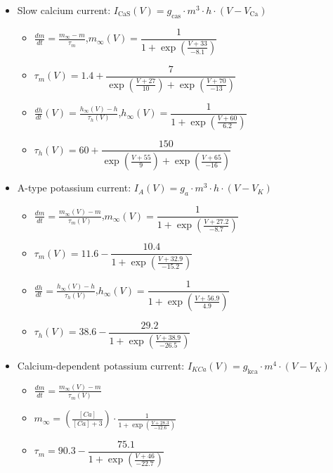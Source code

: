 \documentclass[../main.tex]{subfiles}
\begin{document}
\begin{itemize}
    \item Slow calcium current:
    $I_{\text{CaS}}(V) = g_{\text{cas}} \cdot m^3 \cdot h \cdot (V - V_{\text{Ca}})$
    \begin{itemize}[label=\textopenbullet]
        \item $\frac{dm}{dt} = \frac{m_\infty - m}{\tau_m}$,\quad $m_\infty(V) = \dfrac{1}{1 + \exp\left(\frac{V + 33}{-8.1}\right)}$
        \item $\tau_m(V) = 1.4 + \dfrac{7}{\exp\left(\frac{V + 27}{10}\right) + \exp\left(\frac{V + 70}{-13}\right)}$
        \item $\frac{dh}{dt}(V) = \frac{h_\infty(V) - h}{\tau_h(V)}$,\quad $h_\infty(V) = \dfrac{1}{1 + \exp\left(\frac{V + 60}{6.2}\right)}$
        \item $\tau_h(V) = 60 + \dfrac{150}{\exp\left(\frac{V + 55}{9}\right) + \exp\left(\frac{V + 65}{-16}\right)}$
    \end{itemize}

    \item A-type potassium current:
    $I_{A}(V) = g_{a} \cdot m^3 \cdot h \cdot (V - V_{K})$
    \begin{itemize}[label=\textopenbullet]
        \item $\frac{dm}{dt} = \frac{m_\infty(V) - m}{\tau_m(V)}$,\quad $m_\infty(V) = \dfrac{1}{1 + \exp\left(\frac{V + 27.2}{-8.7}\right)}$
        \item $\tau_m(V) = 11.6 - \dfrac{10.4}{1 + \exp\left(\frac{V + 32.9}{-15.2}\right)}$
        \item $\frac{dh}{dt} = \frac{h_\infty(V) - h}{\tau_h(V)}$,\quad $h_\infty(V) = \dfrac{1}{1 + \exp\left(\frac{V + 56.9}{4.9}\right)}$
        \item $\tau_h(V) = 38.6 - \dfrac{29.2}{1 + \exp\left(\frac{V + 38.9}{-26.5}\right)}$
    \end{itemize}

    \item Calcium-dependent potassium current:
    $I_{KCa}(V) = g_{\text{kca}} \cdot m^4 \cdot (V - V_K)$
    \begin{itemize}[label=\textopenbullet]
        \item $\frac{dm}{dt} = \frac{m_\infty(V) - m}{\tau_m(V)}$
        \item $m_\infty = \left(\frac{[Ca]}{[Ca] + 3}\right) \cdot \frac{1}{1 + \exp\left(\frac{V + 28.3}{-12.6}\right)}$
        \item $\tau_m = 90.3 - \dfrac{75.1}{1 + \exp\left(\frac{V + 46}{-22.7}\right)}$
    \end{itemize}


\end{itemize}
\end{document}
